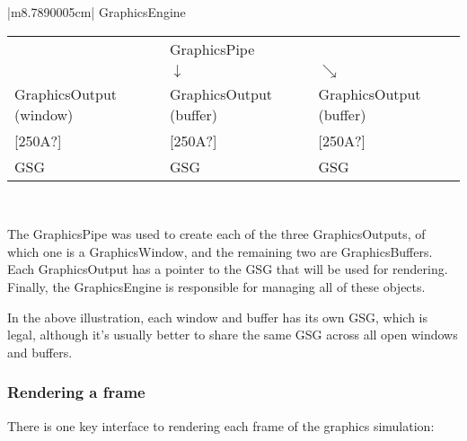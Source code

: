\documentclass[a4paper]{article}
\begin{document}
\begin{center}
\tablefirsthead{}
\tablehead{}
\tabletail{}
\tablelasttail{}
\begin{supertabular}{|m{8.7890005cm}|}
\hline
GraphicsEngine 

\begin{table}
\raggedright
\begin{tabular}{m{2.702cm}|m{2.675cm}|m{2.7549999cm}}

\hhline{~-~}
~
 &
GraphicsPipe &
~
\\\hhline{~-~}
\multicolumn{1}{m{2.702cm}}{$\searrow $} &
\multicolumn{1}{m{2.675cm}}{$\downarrow $} &
$\searrow $\\\hline
\multicolumn{1}{|m{2.702cm}|}{GraphicsOutput\newline
(window)} &
GraphicsOutput\newline
(buffer) &
\multicolumn{1}{m{2.7549999cm}|}{GraphicsOutput\newline
(buffer)}\\\hline
\multicolumn{1}{m{2.702cm}}{[250A?]} &
\multicolumn{1}{m{2.675cm}}{[250A?]} &
[250A?]\\\hline
\multicolumn{1}{|m{2.702cm}|}{GSG} &
GSG &
\multicolumn{1}{m{2.7549999cm}|}{GSG}\\\hline\end{tabular}

\end{table}
\\\hline
\end{supertabular}
\end{center}
{\color{black}
The GraphicsPipe was used to create each of the three GraphicsOutputs, of which one is a GraphicsWindow, and the
remaining two are GraphicsBuffers. Each GraphicsOutput has a pointer to the GSG that will be used for rendering.
Finally, the GraphicsEngine is responsible for managing all of these objects. }

{\color{black}
In the above illustration, each window and buffer has its own GSG, which is legal, although it's usually better to share
the same GSG across all open windows and buffers. }


\bigskip

\subsubsection[Rendering a frame]{Rendering a frame}
\hypertarget{RefHeading3853869075401}{}{\color{black}
There is one key interface to rendering each frame of the graphics simulation:}
\end{document}
